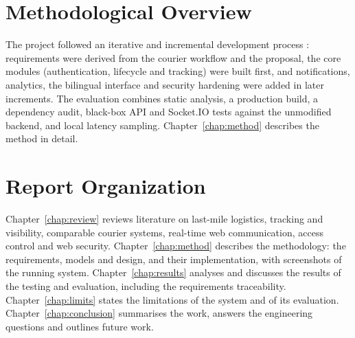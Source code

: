\section{Methodological Overview}
\label{sec:method-overview}

The project followed an iterative and incremental development process \cite{larman2003iterative,sommerville2016se}: requirements were derived from the courier workflow and the proposal, the core modules (authentication, lifecycle and tracking) were built first, and notifications, analytics, the bilingual interface and security hardening were added in later increments. The evaluation combines static analysis, a production build, a dependency audit, black-box API and Socket.IO tests against the unmodified backend, and local latency sampling. Chapter~\ref{chap:method} describes the method in detail.

\section{Report Organization}
\label{sec:organization}

Chapter~\ref{chap:review} reviews literature on last-mile logistics, tracking and visibility, comparable courier systems, real-time web communication, access control and web security. Chapter~\ref{chap:method} describes the methodology: the requirements, models and design, and their implementation, with screenshots of the running system. Chapter~\ref{chap:results} analyses and discusses the results of the testing and evaluation, including the requirements traceability. Chapter~\ref{chap:limits} states the limitations of the system and of its evaluation. Chapter~\ref{chap:conclusion} summarises the work, answers the engineering questions and outlines future work.
